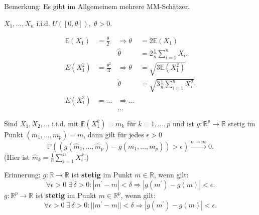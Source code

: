 \documentclass{tstextbook}
\newcommand{\E}{\mathbb E}
\newcommand{\R}{\mathbb R}
\newcommand{\Prob}{\mathbb P}
\begin{document}
\begin{remark}
	Bemerkung: Es gibt im Allgemeinem mehrere MM-Schätzer.
\end{remark}

\begin{example}[Gleichverteilung]
	$ X_1, \ldots, X_n $ i.i.d. $ U([0,\theta]), \; \theta > 0 $.
	
	\[
	\begin{aligned}
		\E(X_1) &= \frac{\theta}{2} & \Rightarrow \theta & = 2\E\left(X_1\right) \\
		& & \hat{\theta} & = 2 \frac{1}{n} \sum_{i=1}^{n} X_i. \\
		E(X_1^2) &= \frac{\theta^2}{3} & \Rightarrow \theta & = \sqrt{3\E\left(X_1^2\right)} \\
		& & \tilde{\theta} & = \sqrt{3\frac{1}{n} \sum_{i=1}^{n} X_i^2}. \\
		E(X_1^3) &= \ldots & \Rightarrow \ldots \\
		& & \ldots
	\end{aligned}
	\]
	
\end{example}


\begin{lemma}
	\label{lemma_stetig}
	Sind $ X_1,X_2,\ldots $ i.i.d. mit $ \E(X_1^k) = m_k $ für $ k = 1,\ldots, p $ und ist $ g:\R^p \rightarrow \R $ stetig im Punkt $ \left(m_1, \ldots, m_p \right) = m $, dann gilt für jedes $ \epsilon > 0 $
	\[
	\Prob\left(\left(g\left(\hat{m}_1,\ldots,\hat{m}_p\right)-g\left(m_1,\ldots,m_p\right)\right) > \epsilon \right) \overset{n\to\infty}{\longrightarrow} 0.
	\]
	(Hier ist $ \hat{m}_k = \frac{1}{n} \sum_{i=1}^{n} X_i^k $.)
\end{lemma}


\begin{remark}
	Erinnerung:
	$ g: \R \rightarrow \R $ ist \textbf{stetig} im Punkt $ m \in \R $, wenn gilt: 
	\[ \forall \epsilon > 0 \; \exists \, \delta >0 \colon |m^\prime - m| < \delta \Rightarrow |g(m^\prime) - g(m)| < \epsilon. \]
	$ g: \R^p \rightarrow \R $ ist \textbf{stetig} im Punkt $ m \in \R^p $, wenn gilt: 
	\[ \forall \epsilon > 0 \; \exists \, \delta >0 \colon ||m^\prime - m|| < \delta \Rightarrow |g(m^\prime) - g(m)| < \epsilon. \]
\end{remark}
\end{document}
